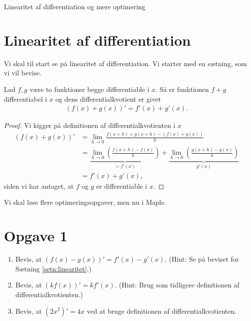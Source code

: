 
\begin{center}
\Huge
Linearitet af differentiation og mere optimering
\end{center}
\section*{Linearitet af differentiation}
Vi skal til start se på linearitet af differentiation. Vi starter med en sætning, som vi vil bevise.
\begin{setn}\label{setn:linearitet}
Lad $f,g$ være to funktioner begge differentiable i $x$. Så er funktionen $f+g$ differentiabel i $x$ og dens differentialkvotient er givet
\begin{align*}
(f(x)+g(x))' = f'(x)+g'(x).
\end{align*}
\end{setn}
\begin{proof}
Vi kigger på definitionen af differentialkvotienten i $x$
\begin{align*}
(f(x)+g(x))' &= \lim_{h\to 0}\frac{f(x+h)+g(x+h)-(f(x)+g(x))}{h}\\
			&= \underbrace{\lim_{h\to 0}\left(\frac{f(x+h)-f(x)}{h}\right)}_{=f'(x)} + \underbrace{\lim_{h\to 0}\left(\frac{g(x+h)-g(x)}{h}\right)}_{g'(x)}\\
			&=f'(x)+g'(x),
\end{align*}
siden vi har antaget, at $f$ og $g$ er differentiable i $x$.
\end{proof}
Vi skal løse flere optimeringsopgaver, men nu i Maple.
\section*{Opgave 1}
\begin{enumerate}[label=\roman*)]
\item Bevis, at $(f(x)-g(x))' = f'(x) -g'(x)$. (Hint: Se på beviset for Sætning \ref{setn:linearitet}.)
\item Bevis, at $(kf(x))' = kf'(x).$ (Hint: Brug som tidligere definitionen af differentialkvotienten.)
\item Bevis, at $(2x^2)' = 4x$ ved at bruge definitionen af differentialkvotienten.
\end{enumerate}

